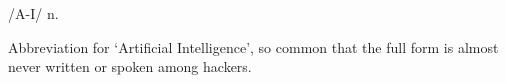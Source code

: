  /A-I/ n.

Abbreviation for `Artificial Intelligence', so common that the full form is almost never written or spoken among hackers.

